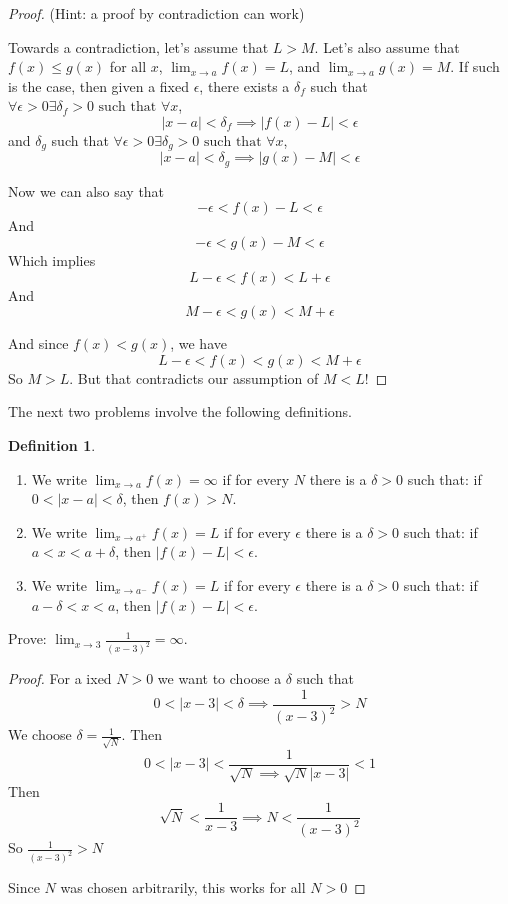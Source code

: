 \documentclass{article} %
\theoremstyle{plain}
\theoremstyle{definition}
\newtheorem*{definition*}{Definition}
\newcommand{\abs}[1]{\left\lvert #1 \right\rvert} %
\begin{document}
\begin{proof} (Hint: a proof by contradiction can work)

  Towards a contradiction, let's assume that $L > M$.  Let's also assume that
$f(x) \leq g(x)$ for all $x$, $\lim_{x \rightarrow a} f(x)=L$, and $\lim_{x \rightarrow a} g(x)=M$.  If such is the case, then given a fixed
$\epsilon$, there exists a
$\delta_f$ such that
$ \forall \epsilon > 0 \exists \delta_f > 0 \text{ such that } \forall x$,
\[ |x-a| < \delta_f \implies |f(x) - L| < \epsilon \]
and $\delta_g$  such that
$ \forall \epsilon > 0 \exists \delta_g > 0 \text{ such that } \forall x$,
\[ |x-a| < \delta_g \implies |g(x) - M| < \epsilon \]

  Now we can also say that
\[ -\epsilon < f(x) - L < \epsilon \]
  And
\[ -\epsilon < g(x) - M < \epsilon \]
Which implies 
  \[ L-\epsilon < f(x) < L + \epsilon \]
  And
\[ M -\epsilon < g(x) < M + \epsilon \]

And since $f(x) < g(x)$, we have
\[ L -\epsilon < f(x) < g(x) < M + \epsilon \]
So $M > L$.  But that contradicts our assumption of $M < L$!

\end{proof} 
\newpage

The next two problems involve the following definitions. 

\begin{definition*} \ 
\begin{enumerate}
\item We write $\lim_{x \rightarrow a} f(x) = \infty$ if for every $N$ there is a $\delta > 0$ such that: if $0 < \abs{x-a} < \delta$, then $f(x) >  N$. 
\item We write $\lim_{x \rightarrow a^+} f(x) = L$ if for every $\epsilon$ there is a $\delta > 0$ such that: if $a < x < a+\delta$, then $\abs{f(x)-L} <\epsilon$. 
\item We write $\lim_{x \rightarrow a^-} f(x) = L$ if for every $\epsilon$ there is a $\delta > 0$ such that: if $a-\delta < x < a$, then $\abs{f(x)-L} <\epsilon$. 
\end{enumerate}
\end{definition*}


\noindent{} Prove: $ \lim_{x \rightarrow 3} \frac{1}{(x-3)^2} = \infty$.

\begin{proof} 
  For a ixed $N>0$ we want to choose a $\delta$ such that 
    \[ 0 < |x-3| < \delta \implies \frac{1}{(x-3)^2} > N \]
    We choose $\delta = \frac{1}{\sqrt{N}}$.  Then
    \[ 0 < |x-3| < \frac{1}{\sqrt{N} \implies \sqrt{N}|x-3|} < 1 \]
    Then
    \[ \sqrt{N} < \frac{1}{x-3} \implies N < \frac{1}{(x-3)^2}  \]
    So $\frac{1}{(x-3)^2 }> N$ 

    Since $N$ was chosen arbitrarily, this works for all $N>0$
\end{proof} 
\end{document}
